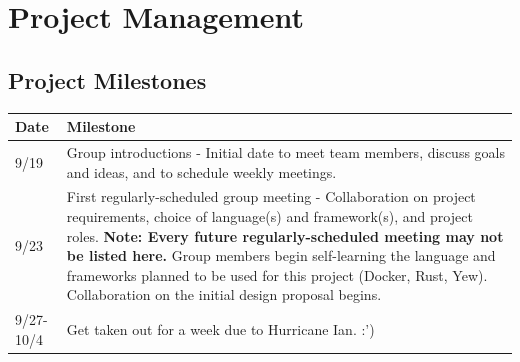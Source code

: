 \documentclass[
    paper=letter,
    parskip=half,
    fontsize=12pt,
    titlepage=firstiscover,
    toc=bibliography,
    numbers=endperiod
]{scrartcl}
\let\oldsection\section
\renewcommand{\section}{\newpage\oldsection}
\begin{document}
\section{Project Management}

\subsection{Project Milestones}

{\renewcommand{\arraystretch}{1.4}
    \begin{tabularx}{\textwidth}{|l|X|}
        \hline
        \textbf{Date} & \textbf{Milestone}                                                                                                                                                                                                                                                                                                                                                                                                                   \\\hline
        9/19          & Group introductions - Initial date to meet team members, discuss goals and ideas, and to schedule weekly meetings.                                                                                                                                                                                                                                                                                                                   \\\hline
        9/23          & First regularly-scheduled group meeting - Collaboration on project requirements, choice of language(s) and framework(s), and project roles. \newline \textbf{Note: Every future regularly-scheduled meeting may not be listed here.} \newline \newline Group members begin self-learning the language and frameworks planned to be used for this project (Docker, Rust, Yew). Collaboration on the initial design proposal begins.   \\\hline
        9/27-10/4     & Get taken out for a week due to Hurricane Ian. :')                                                                                                                                                                                                                                                                                                                                                                                   \\\hline

\end{tabularx}}
\end{document}
